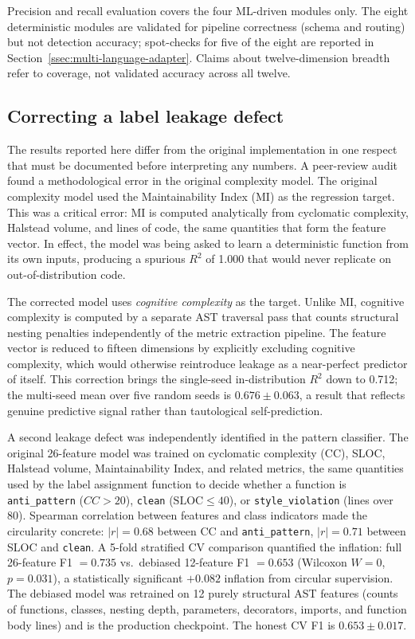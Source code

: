 \documentclass[12pt, oneside]{report}
\begin{document}
Precision and recall evaluation covers the four ML-driven modules only. The eight deterministic modules are validated for pipeline correctness (schema and routing) but not detection accuracy; spot-checks for five of the eight are reported in Section~\ref{ssec:multi-language-adapter}. Claims about twelve-dimension breadth refer to coverage, not validated accuracy across all twelve.

\subsection{Correcting a label leakage defect}
\label{ssec:audit}

The results reported here differ from the original implementation in one respect that must
be documented before interpreting any numbers. A peer-review audit found a methodological
error in the original complexity model. The original complexity
model used the Maintainability Index (MI) as the regression target. This was a critical
error: MI is computed analytically from cyclomatic complexity, Halstead volume, and
lines of code, the same quantities that form the feature vector. In effect, the model
was being asked to learn a deterministic function from its own inputs, producing a
spurious $R^2$ of 1.000 that would never replicate on out-of-distribution code.

The corrected model uses \textit{cognitive complexity} as the target. Unlike MI, cognitive
complexity is computed by a separate AST traversal pass that counts structural nesting
penalties independently of the metric extraction pipeline. The feature vector is reduced
to fifteen dimensions by explicitly excluding cognitive complexity, which would otherwise
reintroduce leakage as a near-perfect predictor of itself. This correction brings the single-seed in-distribution $R^2$ down to 0.712; the
multi-seed mean over five random seeds is $0.676 \pm 0.063$, a result that reflects
genuine predictive signal rather than tautological self-prediction.

A second leakage defect was independently identified in the pattern classifier. The
original 26-feature model was trained on cyclomatic complexity (CC), SLOC, Halstead
volume, Maintainability Index, and related metrics, the same quantities used by the
label assignment function to decide whether a function is \texttt{anti\_pattern}
($CC > 20$), \texttt{clean} ($\text{SLOC} \leq 40$), or \texttt{style\_violation}
(lines over 80). Spearman correlation between features and class indicators made the
circularity concrete: $|r| = 0.68$ between CC and \texttt{anti\_pattern},
$|r| = 0.71$ between SLOC and \texttt{clean}. A 5-fold stratified CV comparison
quantified the inflation: full 26-feature F1 $= 0.735$ vs.\ debiased 12-feature
F1 $= 0.653$ (Wilcoxon $W=0$, $p = 0.031$), a statistically significant
$+0.082$ inflation from circular supervision. The debiased model was retrained on
12 purely structural AST features (counts of functions, classes, nesting depth,
parameters, decorators, imports, and function body lines) and is the production
checkpoint. The honest CV F1 is $0.653 \pm 0.017$.
\end{document}
